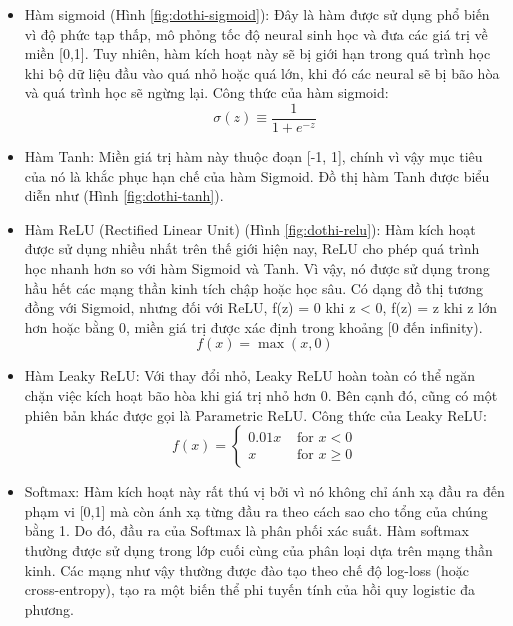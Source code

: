 \begin{itemize}
    \item Hàm sigmoid (Hình \ref{fig:dothi-sigmoid}): Đây là hàm được sử dụng phổ biến vì độ phức tạp thấp, mô phỏng tốc độ neural sinh học và đưa các giá trị về miền [0,1]. Tuy nhiên, hàm kích hoạt này sẽ bị giới hạn trong quá trình học khi bộ dữ liệu đầu vào quá nhỏ hoặc quá lớn, khi đó các neural sẽ bị bão hòa và quá trình học sẽ ngừng lại. Công thức của hàm sigmoid:
    \begin{equation}
        \sigma(z) \equiv \frac{1}{1+e^{-z}}
    \end{equation}
    
    \item Hàm Tanh: Miền giá trị hàm này thuộc đoạn [-1, 1], chính vì vậy mục tiêu của nó là khắc phục hạn chế của hàm Sigmoid. Đồ thị hàm Tanh được biểu diễn như (Hình \ref{fig:dothi-tanh}).
    
    \item Hàm ReLU (Rectified Linear Unit) (Hình \ref{fig:dothi-relu}): Hàm kích hoạt được sử dụng nhiều nhất trên thế giới hiện nay, ReLU cho phép quá trình học nhanh hơn so với hàm Sigmoid và Tanh. Vì vậy, nó được sử dụng trong hầu hết các mạng thần kinh tích chập hoặc học sâu. Có dạng đồ thị tương đồng với Sigmoid, nhưng đối với ReLU, f(z) = 0 khi z < 0, f(z) = z khi z lớn hơn hoặc bằng 0, miền giá trị được xác định trong khoảng [0 đến infinity).
    \begin{equation}
        f(x)=\max (x, 0)
    \end{equation}
    
    \item Hàm Leaky ReLU: Với thay đổi nhỏ, Leaky ReLU hoàn toàn có thể ngăn chặn việc kích hoạt bão hòa khi giá trị nhỏ hơn 0. Bên cạnh đó, cũng có một phiên bản khác được gọi là Parametric ReLU. Công thức của Leaky ReLU:
    \begin{equation}
        f(x)=\left\{\begin{array}{ll}
        {0.01 x} & {\text { for } x<0} \\
        {x} & {\text { for } x \geq 0}
        \end{array}\right.
    \end{equation}
    
    \item Softmax: Hàm kích hoạt này rất thú vị bởi vì nó không chỉ ánh xạ đầu ra đến phạm vi [0,1] mà còn ánh xạ từng đầu ra theo cách sao cho tổng của chúng bằng 1. Do đó, đầu ra của Softmax là phân phối xác suất. Hàm softmax thường được sử dụng trong lớp cuối cùng của phân loại dựa trên mạng thần kinh. Các mạng như vậy thường được đào tạo theo chế độ log-loss (hoặc  cross-entropy), tạo ra một biến thể phi tuyến tính của hồi quy logistic đa phương.

\end{itemize}

